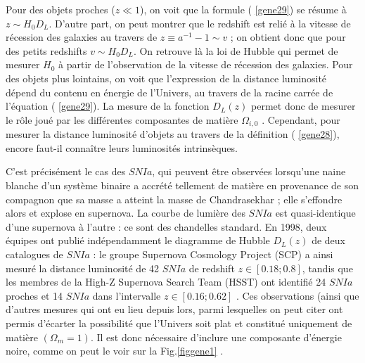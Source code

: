 \documentclass[a4paper,12pt]{report}
\theoremstyle{plain}
\theoremstyle{plain}
\begin{document}
Pour des objets proches ($ z  \ll 1 $), on voit que la formule ( \ref{gene29}) se r\'esume \`a $ z \sim H_0 D_L $.
D'autre part, on peut montrer que le redshift est reli\'e \`a la vitesse de r\'ecession des galaxies
au travers de $ z \equiv  a^{-1} - 1 \sim v $ ; on obtient donc que pour des petits redshifts $ v \sim H_0 D_L $.
On retrouve l\`a la loi de Hubble qui permet de mesurer $H_0$ \`a partir de l'observation de la
vitesse de r\'ecession des galaxies. Pour des objets plus lointains, on voit que l'expression
de la distance luminosit\'e d\'epend du contenu en \'energie de l'Univers, au travers de la
racine carr\'ee de l'\'equation ( \ref{gene29}). La mesure de la fonction $ D_L(z) $ permet donc de mesurer
le r\^ole jou\'e par les diff\'erentes composantes de mati\`ere $ \Omega_{i,0} $ . Cependant, pour mesurer la
distance luminosit\'e d'objets au travers de la d\'efinition ( \ref{gene28}), encore faut-il conna\^itre leurs
luminosit\'es intrins\`eques.

C'est pr\'ecis\'ement le cas des  $ SN Ia$, qui peuvent \^etre observ\'ees lorsqu'une naine blanche
d'un syst\`eme binaire a accr\'et\'e tellement de mati\`ere en provenance de son compagnon que
sa masse a atteint la masse de Chandrasekhar ; elle s'effondre alors et explose en supernova.
La courbe de lumi\`ere des $ SN Ia $ est quasi-identique d'une supernova \`a l'autre : ce sont des
chandelles standard. En 1998, deux \'equipes ont publi\'e ind\'ependamment le diagramme de
Hubble $ D_L(z) $ de deux catalogues de $ SN Ia $ : le groupe Supernova Cosmology Project (SCP)
\cite{213} a ainsi mesur\'e la distance luminosit\'e de 42 $SN Ia$ de redshift $ z \in [0.18; 0.8]$, tandis
que les membres de la High-Z Supernova Search Team (HSST) \cite{224} ont identifi\'e 24 $SN Ia$
proches et 14 $SN Ia$ dans l'intervalle $ z \in [0.16; 0.62]$ . Ces observations (ainsi que d'autres
mesures qui ont eu lieu depuis lors, parmi lesquelles on peut citer \cite{26, 171, 195, 225} ont
permis d'\'ecarter la possibilit\'e que l'Univers soit plat et constitu\'e uniquement de mati\`ere
 $( \Omega_m = 1)$. Il est donc n\'ecessaire d'inclure une composante d'\'energie noire, comme on peut
le voir sur la Fig.\ref{figgene1} .

\end{document}
